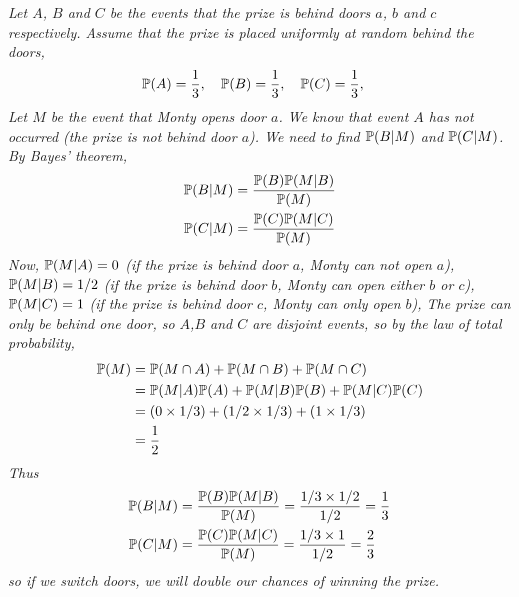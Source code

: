 \begin{exercise}
\begin{questions}
\begin{answer}
\bit
\it Let $A$, $B$ and $C$ be the events that the prize is behind doors $a$, $b$ and $c$ respectively.
\eit
Assume that the prize is placed uniformly at random behind the doors,
\[
\mathbb{P}(A) = \frac{1}{3},\quad \mathbb{P}(B) = \frac{1}{3}, \quad \mathbb{P}(C) = \frac{1}{3},\quad
\]
Let $M$ be the event that Monty opens door $a$.
\bit
\it We know that event $A$ has not occurred (the prize is not behind door $a$).
\it We need to find $\mathbb{P}(B|M)$ and $\mathbb{P}(C|M)$.
\eit
By Bayes' theorem,
\begin{align*}
\mathbb{P}(B|M)		& = \frac{\mathbb{P}(B)\mathbb{P}(M|B)}{\mathbb{P}(M)} \\
\mathbb{P}(C|M)		& = \frac{\mathbb{P}(C)\mathbb{P}(M|C)}{\mathbb{P}(M)}
\end{align*}
Now,
\bit
\it $\mathbb{P}(M|A) = 0$ (if the prize is behind door $a$, Monty can not open $a$),
\it $\mathbb{P}(M|B) = 1/2$ (if the prize is behind door $b$, Monty can open either $b$ or $c$),
\it $\mathbb{P}(M|C) = 1$ (if the prize is behind door $c$, Monty can only open $b$),
\eit
The prize can only be behind one door, so $A$,$B$ and $C$ are disjoint events, so by the law of total probability,
\begin{align*}
\mathbb{P}(M) 
	& = \mathbb{P}(M\cap A) + \mathbb{P}(M\cap B) + \mathbb{P}(M\cap C) \\
	& = \mathbb{P}(M|A)\mathbb{P}(A) + \mathbb{P}(M|B)\mathbb{P}(B) + \mathbb{P}(M|C)\mathbb{P}(C) \\
	& = (0\times 1/3) + (1/2\times 1/3) + (1\times 1/3) \\
	& = \frac{1}{2}
\end{align*}
Thus
\begin{align*}
\mathbb{P}(B|M) & = \frac{\mathbb{P}(B)\mathbb{P}(M|B)}{\mathbb{P}(M)} = \frac{1/3\times 1/2}{1/2} = \frac{1}{3} \\
\mathbb{P}(C|M) & = \frac{\mathbb{P}(C)\mathbb{P}(M|C)}{\mathbb{P}(M)} = \frac{1/3\times 1}{1/2} = \frac{2}{3} \\
\end{align*}
so if we switch doors, we will double our chances of winning the prize.
\end{answer}

\end{questions}
\end{exercise}
\endinput
